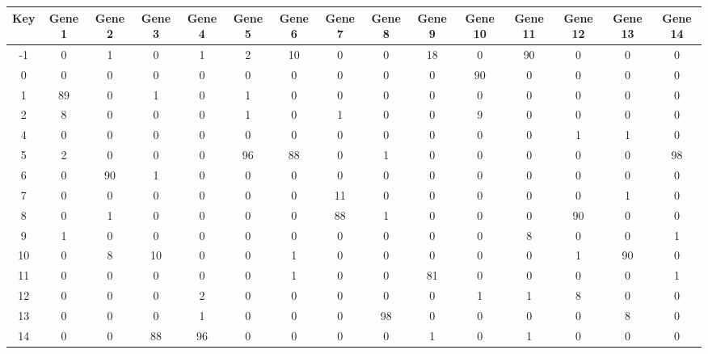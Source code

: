 \begin{tabular}{|c|c|c|c|c|c|c|c|c|c|c|c|c|c|c|}
\hline
Key & Gene 1 & Gene 2 & Gene 3 & Gene 4 & Gene 5 & Gene 6 & Gene 7 & Gene 8 & Gene 9 & Gene 10 & Gene 11 & Gene 12 & Gene 13 & Gene 14 \\
\hline
-1 & 0 & 1 & 0 & 1 & 2 & 10 & 0 & 0 & 18 & 0 & 90 & 0 & 0 & 0 \\
0 & 0 & 0 & 0 & 0 & 0 & 0 & 0 & 0 & 0 & 90 & 0 & 0 & 0 & 0 \\
1 & 89 & 0 & 1 & 0 & 1 & 0 & 0 & 0 & 0 & 0 & 0 & 0 & 0 & 0 \\
2 & 8 & 0 & 0 & 0 & 1 & 0 & 1 & 0 & 0 & 9 & 0 & 0 & 0 & 0 \\
4 & 0 & 0 & 0 & 0 & 0 & 0 & 0 & 0 & 0 & 0 & 0 & 1 & 1 & 0 \\
5 & 2 & 0 & 0 & 0 & 96 & 88 & 0 & 1 & 0 & 0 & 0 & 0 & 0 & 98 \\
6 & 0 & 90 & 1 & 0 & 0 & 0 & 0 & 0 & 0 & 0 & 0 & 0 & 0 & 0 \\
7 & 0 & 0 & 0 & 0 & 0 & 0 & 11 & 0 & 0 & 0 & 0 & 0 & 1 & 0 \\
8 & 0 & 1 & 0 & 0 & 0 & 0 & 88 & 1 & 0 & 0 & 0 & 90 & 0 & 0 \\
9 & 1 & 0 & 0 & 0 & 0 & 0 & 0 & 0 & 0 & 0 & 8 & 0 & 0 & 1 \\
10 & 0 & 8 & 10 & 0 & 0 & 1 & 0 & 0 & 0 & 0 & 0 & 1 & 90 & 0 \\
11 & 0 & 0 & 0 & 0 & 0 & 1 & 0 & 0 & 81 & 0 & 0 & 0 & 0 & 1 \\
12 & 0 & 0 & 0 & 2 & 0 & 0 & 0 & 0 & 0 & 1 & 1 & 8 & 0 & 0 \\
13 & 0 & 0 & 0 & 1 & 0 & 0 & 0 & 98 & 0 & 0 & 0 & 0 & 8 & 0 \\
14 & 0 & 0 & 88 & 96 & 0 & 0 & 0 & 0 & 1 & 0 & 1 & 0 & 0 & 0 \\
\hline
\end{tabular}